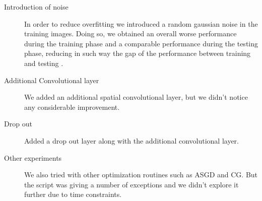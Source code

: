 \documentclass{article}
\begin{document}
\begin{description}
\item[Introduction of noise] In order to reduce overfitting we introduced a random gaussian noise in the training images. Doing so, we obtained an overall worse performance during the training phase and a comparable performance during the testing phase, reducing in such way the gap of the performance between training and testing .

\item[Additional Convolutional layer] We added an additional spatial convolutional layer, but we didn't notice any considerable improvement.

\item[Drop out] Added a drop out layer along with the additional convolutional layer.

\item[Other experiments]
    We also tried with other optimization routines such as ASGD and CG.  But the script was giving a number of exceptions and we didn't explore it further due to time constraints.

\end{description}
\end{document}
